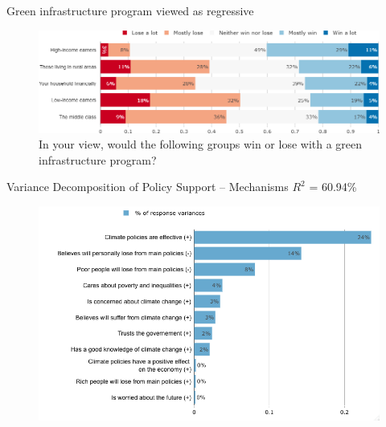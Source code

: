 \begin{framefont}{\small}
\begin{frame}{Green infrastructure program viewed as regressive
	}%
	\begin{figure}[h!]
	\centering
	\caption{In your view, would the following groups win or lose with a green infrastructure program?}
	\includegraphics[width=.87\paperwidth]{../figures/FR/investments_win_lose_FR.png}
	\end{figure}
\end{frame}


\begin{frame}{Variance Decomposition of Policy Support -- Mechanisms}%
\vspace{-.1cm}
{\footnotesize $R^2$ = 60.94\%}
\begin{figure}[h!]
\vspace{-.1cm}
\includegraphics[width=.7\textwidth]{../figures/FR/lmg_main_policies_indices_non_standardized} \\
\end{figure}
\end{frame}



\end{framefont}
